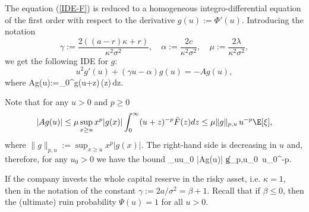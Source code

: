 The equation (\ref{IDE-F}) is reduced to a homogeneous integro-differential equation of the first order with respect to the derivative $g(u):=\Phi'(u)$. Introducing the notation 
$$
\gamma:=\frac{2((a-r)\kappa+r)}{\kappa^2 \sigma^2},\quad \alpha:=\frac{2c}{\kappa^2 \sigma^2}, \quad \mu:=\frac{2\lambda}{\kappa^2 \sigma^2}, 
 $$
we get the following IDE for $g$: 
\begin{equation}
\label{IDE}
 u^2 g'(u) + (\gamma u-\alpha) g(u)= - Ag(u),
\end{equation}
where
\beq
\label{Ag(u)}
 Ag(u):=\mu \int_0^\infty g(u+z)\,(z)\,dz.
\eeq

\smallskip

Note that for any $u>0$ and $p\ge 0$
$$
 |Ag(u)| \le \mu \sup_{x\ge u}x^p|g(x)| \int_0^\infty (u+z)^{-p} \bar F(z) dz \le \mu \|g\|_{p,u} \,u^{-p}\E[\xi],
$$
where $\|g\|_{p,u} :=\sup_{x\ge u}x^p|g(x)|$. The right-hand side is decreasing in $u$ and, therefore, for any $u_0>0 $ we have the bound 
\beq
\label{bound-A}
\sup_{u\ge u_0} |Ag(u)| \le \mu \|g\|_{p,u_0} \,u_0^{-p}\E[\xi]. 
\eeq


\begin{remark} If the company invests the whole capital reserve in the risky asset, i.e. $\kappa=1$, then in the notation of \cite{KP2016} the constant 
$\gamma:=2a/\sigma^2=\beta+1$. Recall that if $\beta\le 0$, then the (ultimate) ruin probability $\Psi(u)=1$ for all $u>0$. 
\end{remark}

